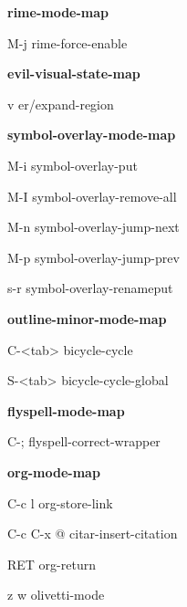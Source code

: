 \documentclass[10pt]{article}
\renewcommand\subsection[1]{\smallskip\par\textbf{\color{heading}#1}}
\begin{document}
\begin{multicols}{4}
  \subsection{rime-mode-map}
  \begin{keylist}
    \item[M-j] rime-force-enable
  \end{keylist}

  \subsection{evil-visual-state-map}
  \begin{keylist}
    \item[v] er/expand-region
  \end{keylist}
  \subsection{symbol-overlay-mode-map}
  \begin{keylist}
    \item[M-i] symbol-overlay-put
    \item[M-I] symbol-overlay-remove-all
    \item[M-n] symbol-overlay-jump-next
    \item[M-p] symbol-overlay-jump-prev
    \item[s-r] symbol-overlay-renameput
  \end{keylist}

  \subsection{outline-minor-mode-map}
  \begin{keylist}
    \item[C-<tab>] bicycle-cycle
    \item[S-<tab>] bicycle-cycle-global
  \end{keylist}

  \subsection{flyspell-mode-map}
  \begin{keylist}
    \item[C-;] flyspell-correct-wrapper
  \end{keylist}

  \subsection{org-mode-map}
  \begin{keylist}
    \item[C-c l] org-store-link
    \item[C-c C-x @] citar-insert-citation
    \item[RET] org-return
    \item[z w] olivetti-mode
  \end{keylist}


\end{multicols}
\end{document}

